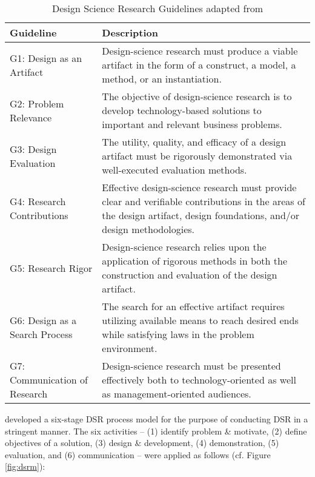 \begin{table}[t]
	\caption[Design Science Research Guidelines]{Design Science Research Guidelines adapted from \citet[p. 83]{Hevner2007}}
	\label{tab:dsrg}
	\centering
	\begin{tabular}{L{.25\textwidth}L{.65\textwidth}}
			\toprule 
			\small \textbf{Guideline} &\small  \textbf{Description} \\ \midrule
			\small G1: Design as an Artifact & 
			\small Design-science research must produce a viable artifact in the form of a construct, a model, a method, or an instantiation.\\ \midrule
			\small G2: Problem Relevance&
			\small The objective of design-science research is to develop technology-based solutions to important and relevant business problems.\\ \midrule
			\small G3: Design Evaluation&
			\small The utility, quality, and efficacy of a design artifact must be rigorously demonstrated via well-executed evaluation methods.\\ \midrule
			\small G4: Research Contributions&
			\small Effective design-science research must provide clear and verifiable contributions in the areas of the design artifact, design foundations, and/or design methodologies.\\ \midrule
			\small G5: Research Rigor&
			\small Design-science research relies upon the application of rigorous methods in both the construction and evaluation of the design artifact.\\ \midrule
			\small G6: Design as a Search Process&
			\small The search for an effective artifact requires utilizing available means to reach desired ends while satisfying laws in the problem environment.\\ \midrule
			\small G7: Communication of Research&
			\small Design-science research must be presented effectively both to technology-oriented as well as management-oriented audiences.\\ \bottomrule
	\end{tabular}
\end{table}

\citet[pp. 52-56]{Peffers2007} developed a six-stage \ac{DSR} process model for the purpose of conducting \ac{DSR} in a stringent manner. The six activities -- (1) identify problem \& motivate, (2) define objectives of a solution, (3) design \& development, (4) demonstration, (5) evaluation, and (6) communication -- were applied as follows (cf. Figure \ref{fig:dsrm}):

